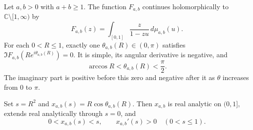 \begin{theorem}
\label{real:thm:arc}
Let $a,b>0$ with $a+b\geq1$. The function $F_{a,b}$ continues
holomorphically to $\mathbb C\setminus[1,\infty)$ by
\begin{equation}\label{real:eq:continuation}
 F_{a,b}(z)=\int_{[0,1]}\frac{z}{1-zu}\,d\mu_{a,b}(u).
\end{equation}
For each $0<R\leq1$, exactly one
$\theta_{a,b}(R)\in(0,\pi)$ satisfies
$\Im F_{a,b}(Re^{i\theta_{a,b}(R)})=0$. It is simple, its angular
derivative is negative, and
\begin{equation}\label{real:eq:arc-enclosure}
 \arccos R<\theta_{a,b}(R)<\frac\pi2.
\end{equation}
The imaginary part is positive before this zero and negative after
it as $\theta$ increases from $0$ to $\pi$.

Set $s=R^2$ and $x_{a,b}(s)=R\cos\theta_{a,b}(R)$. Then
$x_{a,b}$ is real analytic on $(0,1]$, extends real analytically
through $s=0$, and
\begin{equation}\label{real:eq:x-motion}
 0<x_{a,b}(s)<s,\qquad x_{a,b}'(s)>0\quad(0<s\leq1).
\end{equation}
\end{theorem}


